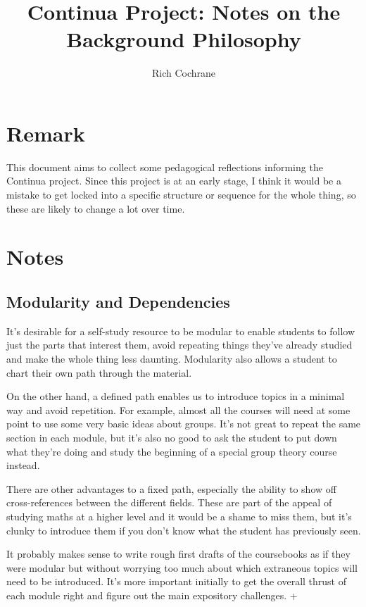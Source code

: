 \documentclass[oneside,english]{amsbook}
\numberwithin{section}{chapter}
\theoremstyle{plain}
\theoremstyle{definition}
\begin{document}
	\title{Continua Project: Notes on the Background Philosophy}
	\author{Rich Cochrane}
	\maketitle
	
	\chapter*{Remark}
	
	This document aims to collect some pedagogical reflections informing the Continua project. Since this project is at an early stage, I think it would be a mistake to get locked into a specific structure or sequence for the whole thing, so these are likely to change a lot over time.
	
	\chapter{Notes}
	
	\section{Modularity and Dependencies}
	
		It's desirable for a self-study resource to be modular to enable students to follow just the parts that interest them, avoid repeating things they've already studied and make the whole thing less daunting. Modularity also allows a student to chart their own path through the material.
		
		On the other hand, a defined path enables us to introduce topics in a minimal way and avoid repetition. For example, almost all the courses will need at some point to use some very basic ideas about groups. It's not great to repeat the same section in each module, but it's also no good to ask the student to put down what they're doing and study the beginning of a special group theory course instead.
		
		There are other advantages to a fixed path, especially the ability to show off cross-references between the different fields. These are part of the appeal of studying maths at a higher level and it would be a shame to miss them, but it's clunky to introduce them if you don't know what the student has previously seen.
		
		It probably makes sense to write rough first drafts of the coursebooks as if they were modular but without worrying too much about which extraneous topics will need to be introduced. It's more important initially to get the overall thrust of each module right and figure out the main expository challenges. +
		
\end{document}

